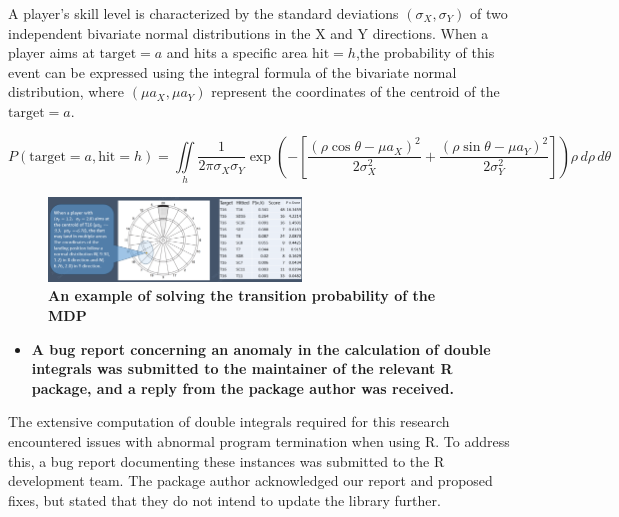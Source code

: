 \documentclass[cjjs]{ipart}
\theoremstyle{plain}
\begin{document}
\text A player's skill level is characterized by the standard deviations
$(\sigma_X, \sigma_Y)$ of two independent bivariate normal distributions in the X and Y directions. When a player aims at ${\text{target}} = a$ and hits a specific area $\text{hit} = h$,the probability of this event can be expressed using the integral formula of the bivariate normal distribution, where $(\mu a_X, \mu a_Y)$ represent the coordinates of the centroid of the $\text{target} = a$.

\[
P(\text{target} = a, \text{hit} = h) = \iint\limits_h \frac{1}{2 \pi \sigma_X \sigma_Y} 
\exp\left( - \left[ \frac{(\rho \cos \theta - \mu a_X)^2}{2 \sigma_X^2} 
+ \frac{(\rho \sin \theta - \mu a_Y)^2}{2 \sigma_Y^2} \right] \right) 
\rho \, d\rho \, d\theta
\]

\begin{figure}[H]
    \centering
    \includegraphics[width=0.60\textwidth]{10.png} 
    \caption{\textbf{An example of solving the transition probability
of the MDP}}
    \label{fig:dartboard}
\end{figure}

\begin{itemize}
    \item \textbf{A bug report concerning an anomaly in the calculation of double integrals was submitted to the maintainer of the relevant R package, and a reply from the package author was received.}
\end{itemize}

\text The extensive computation of double integrals required for this research encountered issues with abnormal program termination when using R. To address this, a bug report documenting these instances was submitted to the R development team. The package author acknowledged our report and proposed fixes, but stated that they do not intend to update the library further.
\end{document}
